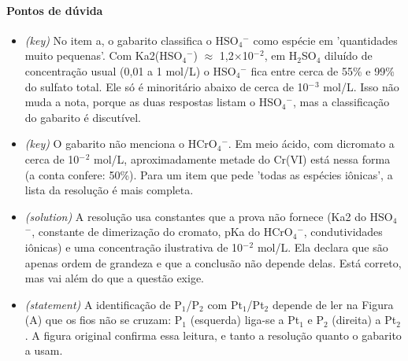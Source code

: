 \documentclass{article}%
\begin{document}
\paragraph{Pontos de dúvida}%
\begin{itemize}%
\item%
\textit{(key)} No item a, o gabarito classifica o HSO$_{4}$$^{-}$ como espécie em 'quantidades muito pequenas'. Com Ka2(HSO$_{4}$$^{-}$) $\approx$ 1,2$\times$10$^{-}$$^2$, em H$_{2}$SO$_{4}$ diluído de concentração usual (0,01 a 1 mol/L) o HSO$_{4}$$^{-}$ fica entre cerca de 55\% e 99\% do sulfato total. Ele só é minoritário abaixo de cerca de 10$^{-}$$^3$ mol/L. Isso não muda a nota, porque as duas respostas listam o HSO$_{4}$$^{-}$, mas a classificação do gabarito é discutível.%
\item%
\textit{(key)} O gabarito não menciona o HCrO$_{4}$$^{-}$. Em meio ácido, com dicromato a cerca de 10$^{-}$$^2$ mol/L, aproximadamente metade do Cr(VI) está nessa forma (a conta confere: 50\%). Para um item que pede 'todas as espécies iônicas', a lista da resolução é mais completa.%
\item%
\textit{(solution)} A resolução usa constantes que a prova não fornece (Ka2 do HSO$_{4}$$^{-}$, constante de dimerização do cromato, pKa do HCrO$_{4}$$^{-}$, condutividades iônicas) e uma concentração ilustrativa de 10$^{-}$$^2$ mol/L. Ela declara que são apenas ordem de grandeza e que a conclusão não depende delas. Está correto, mas vai além do que a questão exige.%
\item%
\textit{(statement)} A identificação de P$_{1}$/P$_{2}$ com Pt$_{1}$/Pt$_{2}$ depende de ler na Figura (A) que os fios não se cruzam: P$_{1}$ (esquerda) liga{-}se a Pt$_{1}$ e P$_{2}$ (direita) a Pt$_{2}$. A figura original confirma essa leitura, e tanto a resolução quanto o gabarito a usam.%
\end{itemize}%
\end{document}
